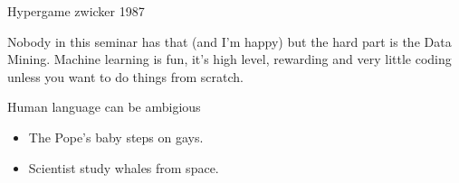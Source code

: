 \documentclass{beamer}
\begin{document}
\begin{frame}
Hypergame zwicker 1987
\end{frame}

\begin{frame}
Nobody in this seminar has that (and I'm happy) but the hard part is the Data Mining.
Machine learning is fun, it's high level, rewarding and very little coding unless you want to do things from scratch.
\end{frame}

\begin{frame}
    Human language can be ambigious
    \begin{itemize}
            \item The Pope's baby steps on gays.
            \item Scientist study whales from space.
    \end{itemize}
\end{frame}
\end{document}
